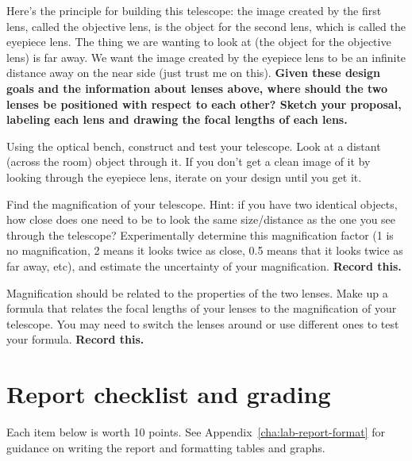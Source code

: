 \begin{steps}
	\item Here's the principle for building this telescope: the image created by the first lens, called the objective lens, is the object for the second lens, which is called the eyepiece lens. The thing we are wanting to look at (the object for the objective lens) is far away. We want the image created by the eyepiece lens to be an infinite distance away on the near side (just trust me on this). \textbf{Given these design goals and the information about lenses above, where should the two lenses be positioned with respect to each other? Sketch your proposal, labeling each lens and drawing the focal lengths of each lens.}
	
	\item Using the optical bench, construct and test your telescope. Look at a distant (across the room) object through it. If you don't get a clean image of it by looking through the eyepiece lens, iterate on your design until you get it.
	
	\item Find the magnification of your telescope. Hint: if you have two identical objects, how close does one need to be to look the same size/distance as the one you see through the telescope? Experimentally determine this magnification factor (1 is no magnification, 2 means it looks twice as close, 0.5 means that it looks twice as far away, etc), and estimate the uncertainty of your magnification. \textbf{Record this.}
	
	\item Magnification should be related to the properties of the two lenses. Make up a formula that relates the focal lengths of your lenses to the magnification of your telescope. You may need to switch the lenses around or use different ones to test your formula. \textbf{Record this.}
\end{steps}

\section{Report checklist and grading}

Each item below is worth 10 points. See Appendix\ \ref{cha:lab-report-format} for guidance on writing the report and formatting tables and graphs.

